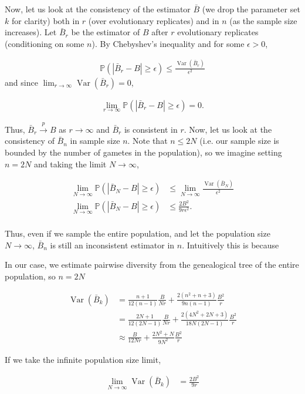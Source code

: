\documentclass[11pt]{article}
\renewcommand{\P}{\mathbb{P}}
\DeclareMathOperator{\var}{Var}
\begin{document}
Now, let us look at the consistency of the estimator $\bar{B}$ (we drop the
parameter set $k$ for clarity) both in $r$ (over evolutionary replicates) and
in $n$ (as the sample size increases). Let $\bar{B}_r$ be the estimator of $B$
after $r$ evolutionary replicates (conditioning on some $n$). By Chebyshev's
inequality and for some $\epsilon > 0$,

\begin{align}
  \P\left(|\bar{B}_r - B| \ge \epsilon \right)  \le \frac{\var(\bar{B}_r)}{\epsilon^2}
\end{align}
%
and since $\lim_{r \to \infty} \var(\bar{B}_r) = 0$,

\begin{align}
  \lim_{r \to \infty} \P\left(|\bar{B}_r - B| \ge \epsilon \right)  = 0.
\end{align}

Thus, $\bar{B}_r \xrightarrow{p} B$ as $r \to \infty$ and $\bar{B}_r$ is
consistent in $r$. Now, let us look at the consistency of $\bar{B}_n$ in sample
size $n$. Note that $n \le 2N$ (i.e. our sample size is bounded by the number
of gametes in the population), so we imagine setting $n = 2N$ and taking the
limit $N \to \infty$,

\begin{align}
  \lim_{N \to \infty} \P\left(|\bar{B}_N - B| \ge \epsilon \right)  &\le \lim_{N \to \infty} \frac{\var(\bar{B}_N)}{\epsilon^2} \\
  \lim_{N \to \infty} \P\left(|\bar{B}_N - B| \ge \epsilon \right)  &\le \frac{2B^2}{9 r \epsilon^2}. \\
\end{align}

Thus, even if we sample the entire population, and let the population size $N
\to \infty$, $\bar{B}_n$ is still an inconsistent estimator in $n$. Intuitively
this is because 


In our case, we estimate pairwise diversity from the genealogical tree of the
entire population, so $n = 2N$

\begin{align}
  \var(\bar{B}_k) &= \frac{n + 1}{12(n-1)} \frac{B}{N r} + \frac{2(n^2 + n + 3)}{9n(n-1)} \frac{B^2}{r} \\
                  &= \frac{2N + 1}{12(2N-1)} \frac{B}{N r} + \frac{2(4N^2 + 2N + 3)}{18N(2N-1)} \frac{B^2}{r} \\
                  &\approx \frac{B}{12N r} + \frac{2N^2 + N}{9N^2} \frac{B^2}{r}
\end{align}

If we take the infinite population size limit,

\begin{align}
  \lim_{N \to \infty} \var(\bar{B}_k) &= \frac{2B^2}{9r}
\end{align}




\printbibliography
\end{document}
